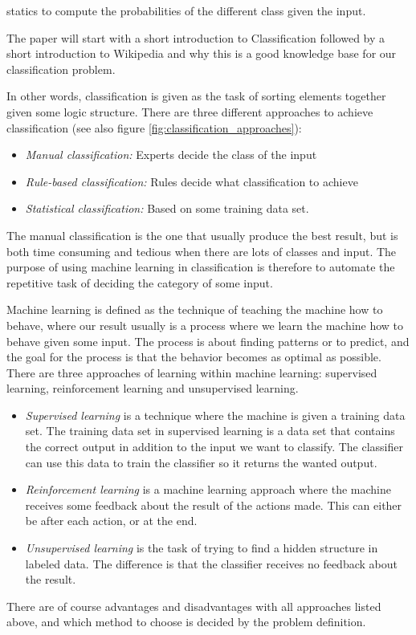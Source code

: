 statics to compute the probabilities of the different class given the input. 




The paper will start with a short introduction to Classification followed by a short introduction to Wikipedia and why this is a good knowledge base for our classification problem. 

In other words, classification is given as the task of sorting elements together given some logic structure. There are three different approaches to achieve classification (see also figure \ref{fig:classification_approaches}): 
\begin{itemize}
\item \textit{Manual classification:} Experts decide the class of the input
\item \textit{Rule-based classification:} Rules decide what classification to achieve
\item \textit{Statistical classification:} Based on some training data set. 
\end{itemize}
The manual classification is the one that usually produce the best result, but is both time consuming and tedious when there are lots of classes and input. The purpose of using machine learning in classification is therefore to automate the repetitive task of deciding the category of some input.

Machine learning is defined as the technique of teaching the machine how to behave, where our result usually is a process where we learn the machine how to behave given some input. The process is about finding patterns or to predict, and the goal for the process is that the behavior becomes as optimal as possible. 
There are three approaches of learning within machine learning: supervised learning, reinforcement learning and unsupervised learning. 
\begin{itemize}
\item \textit{Supervised learning} is a technique where the machine is given a training data set. The training data set in supervised learning is a data set that contains the correct output in addition to the input we want to classify. The classifier can use this data to train the classifier so it returns the wanted output.
\item \textit{Reinforcement learning} is a machine learning approach where the machine receives some feedback about the result of the actions made.   This can either be after each action, or at the end. 
\item \textit{Unsupervised learning} is the task of trying to find a hidden structure in labeled data. The difference is that the classifier receives no feedback about the result. 
\end{itemize}
There are of course advantages and disadvantages with all approaches listed above, and which method to choose is decided by the problem definition.

